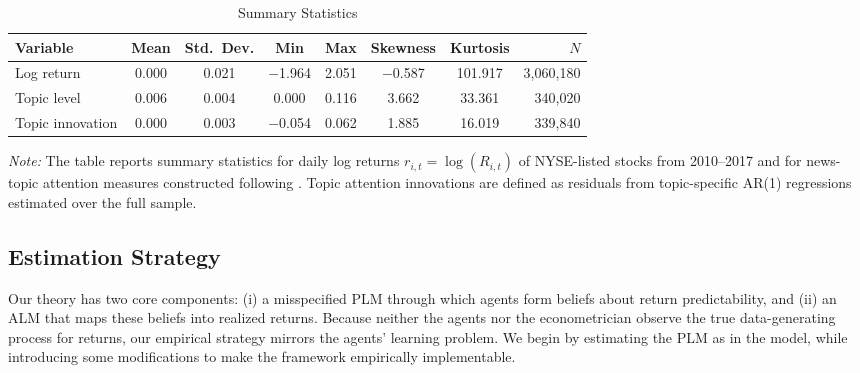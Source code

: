 \documentclass[11pt]{article}
\begin{document}
\begin{table}[H]
\centering
\caption{Summary Statistics}
\label{tab:summary_stats}

\begin{tabularx}{\textwidth}{@{}>{\small}Xccccccr@{}}
\toprule
Variable & Mean & Std.\ Dev. & Min & Max & Skewness & Kurtosis & $N$ \\
\midrule
Log return 
& 0.000 & 0.021 & $-$1.964 & 2.051 & $-$0.587 & 101.917 & 3{,}060{,}180 \\
\midrule
Topic level 
& 0.006 & 0.004 & 0.000 & 0.116 & 3.662 & 33.361 & 340{,}020 \\
Topic innovation 
& 0.000 & 0.003 & $-$0.054 & 0.062 & 1.885 & 16.019 & 339{,}840 \\
\bottomrule
\end{tabularx}

\medskip
\begin{minipage}{\textwidth}
\footnotesize
\textit{Note:} The table reports summary statistics for daily log returns
$r_{i,t}=\log(R_{i,t})$ of NYSE-listed stocks from 2010--2017 and for news-topic
attention measures constructed following \citet{Bybee2021}.
Topic attention innovations are defined as residuals from topic-specific AR(1)
regressions estimated over the full sample.
\end{minipage}
\end{table}


\subsection{Estimation Strategy}

Our theory has two core components: (i) a misspecified PLM through which agents form beliefs about return predictability, and (ii) an ALM that maps these beliefs into realized returns. 
Because neither the agents nor the econometrician observe the true data-generating process for returns, our empirical strategy mirrors the agents’ learning problem.
We begin by estimating the PLM as in the model, while introducing some modifications to make the framework empirically implementable.
\end{document}
